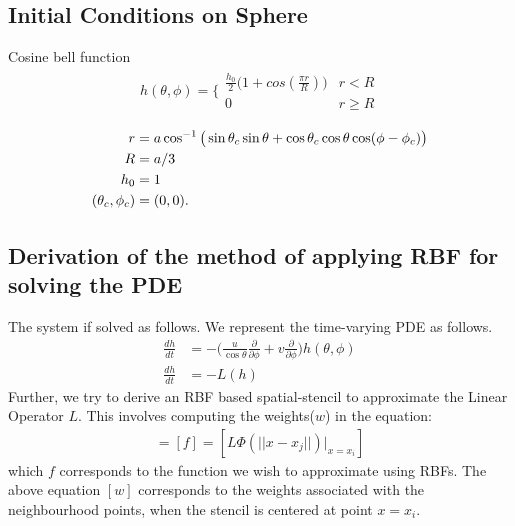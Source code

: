 \documentclass[11pt]{article}
\begin{document}
\subsection{Initial Conditions on Sphere}
Cosine bell function
\begin{align}
h(\theta, \phi) = \bigg\lbrace\begin{array}{cc}
\frac{h_0}{2}\big(1 + cos(\frac{\pi r}{R})\big) & r< R\\
0 & r \geq R
\end{array}
\end{align}

\begin{align}
r &= a \cos^{-1}\big( \sin\theta_c \sin\theta + \cos\theta_c \cos\theta \cos(\phi - \phi_c) \big)\\
R &= a/3 \notag \\
h_0 &= 1 \notag \\
(\theta_c, \phi_c) &= (0,0). \notag
\end{align}

\subsection{Derivation of the method of applying RBF for solving the PDE}
The system if solved as follows. We represent the time-varying PDE as follows.
\begin{align*}
\frac{dh}{dt} &= - \big( \frac{u}{\cos\theta} \frac{\partial}{\partial \phi} + v \frac{\partial}{\partial\phi}\big) h(\theta,\phi) \\
\frac{dh}{dt} &= - L(h)
\end{align*}
Further, we try to derive an RBF based spatial-stencil to approximate the Linear Operator $L$. This involves computing the weights($w$) in the equation:
\begin{align}
[A][w] = [f] = [L \Phi(||x - x_j||) |_{x = x_i}]
\end{align}
which $f$ corresponds to the function we wish to approximate using RBFs. The above equation $[w]$ corresponds to the weights associated with the neighbourhood points, when the stencil is centered at point $x = x_i$.
\end{document}
